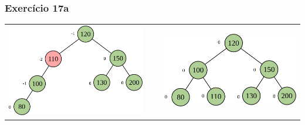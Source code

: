 \documentclass[aspectratio=169]{beamer}
\begin{document}
\begin{frame}[fragile]\frametitle{Exercício 17a}
\begin{tabular}{lll}
\includegraphics[height=0.45\paperheight]{imagens/avl13c.png} & ~ ~ &
\includegraphics[height=0.33\paperheight]{imagens/avl13d.png} \\
\end{tabular}
\end{frame}
\end{document}

